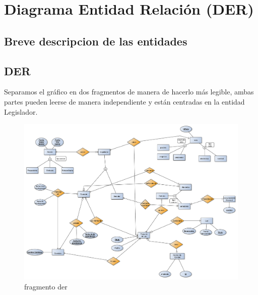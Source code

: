 \documentclass[10pt, a4paper]{article}
\begin{document}
\section{Diagrama Entidad Relaci\'on (DER)}

	\subsection{Breve descripcion de las entidades}

		

	\newpage
	\subsection{DER}

		Separamos el gráfico en dos fragmentos de manera de hacerlo más legible, ambas partes pueden leerse de manera independiente y están centradas en la entidad Legislador.
			
		\begin{figure}[ht]
		    \includegraphics[scale=.30]{./imagenes/DERParteDeAbajo.pdf}
		    \caption{fragmento der} 
		    \label{fig:derparte1}
		\end{figure}
				
\end{document}
